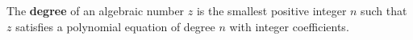 The \textbf{degree} of an algebraic number $z$ is the smallest positive integer $n$ such that $z$ satisfies a polynomial equation of degree $n$ with integer coefficients.
